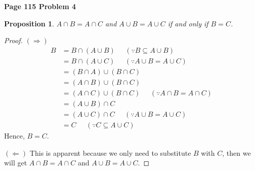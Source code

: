 \documentclass{article}
\newtheorem{prop}[thm]{Proposition}
\begin{document}
\textbf{Page 115 Problem 4}
\begin{prop}
    $A \cap B = A \cap C$ and $A \cup B = A \cup C$ if and only if $B = C$.
\end{prop}
\begin{proof}
    $(\Rightarrow)$ 
    \begin{align}
        B & = B \cap (A \cup B) \;\;\;\;\; (\because B \subseteq A \cup B)\\
        & = B \cap (A \cup C) \;\;\;\;\; (\because A \cup B = A \cup C) \\
        & = (B \cap A) \cup (B \cap C) \\
        & = (A \cap B) \cup (B \cap C) \\
        & = (A \cap C) \cup (B \cap C) \;\;\;\;\; (\because A \cap B = A \cap C)\\
        & = (A \cup B) \cap C \\
        & = (A \cup C) \cap C \;\;\;\;\; (\because A \cup B = A \cup C) \\
        & = C \;\;\;\;\; (\because C \subseteq A \cup C)
    \end{align}
    Hence, $B = C$.

    $(\Leftarrow)$ This is apparent because we only need to substitute $B$ with $C$, then we will get $A \cap B = A \cap C$ and $A \cup B = A \cup C$.
\end{proof}
\bigbreak
\end{document}
